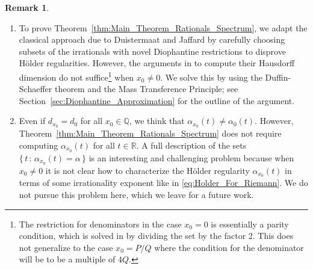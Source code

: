 \documentclass[11pt,reqno]{amsart}
\theoremstyle{definition}
\newtheorem{rem}[thm]{Remark}
\begin{document}
\begin{rem} 
\hfill
\begin{enumerate}
	\item[(a)] To prove Theorem~\ref{thm:Main_Theorem_Rationals_Spectrum},	
we adapt the classical approach due to Duistermaat \cite{Duistermaat1991} and Jaffard \cite{Jaffard1996} 
by carefully choosing subsets of the irrationals with novel Diophantine restrictions to disprove H\"older regularities.
However, 
the arguments in \cite{Jaffard1996} to compute their Hausdorff dimension do not suffice\footnote{The restriction for denominators in the case $x_0=0$ is essentially a parity condition, which is solved in \cite{Jaffard1996} by dividing the set by the factor 2. This does not generalize to the case $x_0 = P/Q$ where the condition for the denominator will be to be a multiple of $4Q$.}
 when $x_0 \neq 0$. 
We solve this by using the Duffin-Schaeffer theorem and the Mass Transference Principle; see Section~\ref{sec:Diophantine_Approximation} for the outline of the argument.
	\item[(b)] Even if $d_{x_0} = d_0$ for all $x_0 \in \mathbb Q$, we think that $\alpha_{x_0}(t) \neq \alpha_0(t)$.	
	However, Theorem~\ref{thm:Main_Theorem_Rationals_Spectrum} does not require computing $\alpha_{x_0}(t)$ for all $t \in \mathbb R$. %
	A full description of the sets $\{ \, t \, : \, \alpha_{x_0}(t) = \alpha \, \}$ is an interesting and challenging problem because when $x_0 \neq 0$ it is not clear how to characterize the H\"older regularity $\alpha_{x_0}(t)$ in terms of some irrationality exponent like in \eqref{eq:Holder_For_Riemann}.
	We do not pursue this problem here, which we leave for a future work. 
\end{enumerate}
\end{rem}
\end{document}
